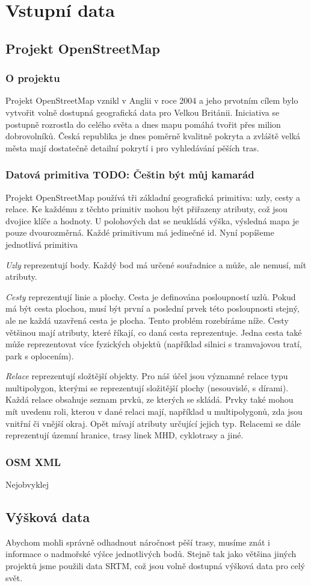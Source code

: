 \chapter{Vstupní data}
\section{Projekt OpenStreetMap}
\subsection{O projektu}
Projekt OpenStreetMap\cite{osmweb} vznikl v Anglii v roce 2004 a jeho prvotním cílem bylo
vytvořit volně dostupná geografická data pro Velkou Británii. Iniciativa se
postupně rozrostla do celého světa a dnes mapu pomáhá tvořit přes milion
dobrovolníků. Česká republika je dnes poměrně kvalitně pokryta a zvláště velká
města mají dostatečně detailní pokrytí i pro vyhledávání pěších tras.
\subsection{Datová primitiva TODO: Češtin být můj kamarád} 
Projekt OpenStreetMap používá tři základní geografická primitiva: uzly, cesty a
relace. Ke každému z těchto primitiv mohou být přiřazeny atributy, což jsou
dvojice klíče a hodnoty. 
U polohových dat se neukládá výška, výsledná mapa je pouze dvourozměrná.
Každé primitivum má jedinečné id.
Nyní popíšeme jednotlivá primitiva

{\em Uzly} reprezentují body. Každý bod má určené souřadnice a může, ale nemusí,
mít atributy.

{\em Cesty} reprezentují linie a plochy. Cesta je definována posloupností uzlů.
Pokud má být cesta plochou, musí být první a poslední prvek této posloupnosti
stejný, ale ne každá uzavřená cesta je plocha. Tento problém rozebíráme níže.
Cesty většinou mají atributy, které říkají, co daná cesta reprezentuje. Jedna
cesta také může reprezentovat více fyzických objektů (například silnici s
tramvajovou tratí, park s oplocením).

{\em Relace} reprezentují složtější objekty. Pro náš účel jsou významné relace
typu multipolygon, kterými se reprezentují složitější plochy (nesouvislé, s
dírami). Každá relace obsahuje seznam prvků, ze kterých se skládá. Prvky také
mohou mít uvedenu roli, kterou v dané relaci mají, například u multipolygonů,
zda jsou vnitřní či vnější okraj. Opět mívají atributy určující jejich typ.
Relacemi se dále reprezentují územní hranice, trasy linek MHD, cyklotrasy a
jiné.

\subsection{OSM XML}
Nejobvyklej


\section{Výšková data}
Abychom mohli správně odhadnout náročnost pěší trasy, musíme znát i informace o
nadmořské výšce jednotlivých bodů. Stejně tak jako většina jiných projektů jsme
použili data SRTM\cite{srtmweb}, což jsou volně dostupná výšková data pro celý
svět. %

